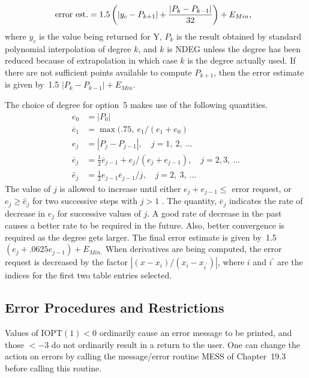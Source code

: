 \documentclass[twoside]{MATH77}
\begin{document}
\begin{equation*}
\hspace{-5pt}\text{error est.}=1.5\left( |y_c-P_{k+1}|+
\frac{|P_k-P_{k-1}|}{32}\right)+E_{Min},
\end{equation*}
where $y_c$ is the value being returned for Y, $P_k$ is the result obtained
by standard polynomial interpolation of degree $k$, and $k$ is NDEG unless
the degree has been reduced because of extrapolation in which case $k$ is
the degree actually used. If there are not sufficient points available to
compute $P_{k+1}$, then the error estimate is given by~1.5 $%
|P_k-P_{k-1}|+E_{Min}.$

The choice of degree for option~5 makes use of the following quantities.
\begin{align*}
e_0 &= |P_0|\\
\overline{e}_1&=\max (.75,\ e_1/(e_1+e_0)\\
e_j &= |P_j - P_{j-1}|,\quad j = 1,\ 2,\ ...\\
\overline{e}_j&=\frac 12\overline{e}_{j-1}+e_j/(e_j+e_{j-1}),\quad j=2,
 3,\ ...\\
\widehat{e}_j&=\frac 12e_{j-1}\overline{e}_{j-1}/j,\quad j=2,\ 3,\ ...
\end{align*}
The value of $j$ is allowed to increase until either $e_j+e_{j-1}\leq $
error request, or $e_j\geq \widehat{e}_j$ for two successive steps with $j>1$%
. The quantity, $\overline{e}_j$ indicates the rate of decrease in $e_j$ for
successive values of $j$. A good rate of decrease in the past causes a
better rate to be required in the future. Also, better convergence is
required as the degree gets larger. The final error estimate is given by~1.5
$(e_j+.0625e_{j-1})+E_{Min\text{.}}$ When derivatives are being computed,
the error request is decreased by the factor $|(x-x_i)/(x_i-x_{i^{\prime }})|
$, where $i$ and $i^{\prime }$ are the indices for the first two table
entries selected.




\subsection{Error Procedures and Restrictions}

Values of IOPT$(1) < 0$ ordinarily cause an error message to be printed, and
those $< -3$ do not ordinarily result in a return to the user. One can
change the action on errors by calling the message/error routine MESS
of Chapter~19.3 before calling this routine.
\end{document}
